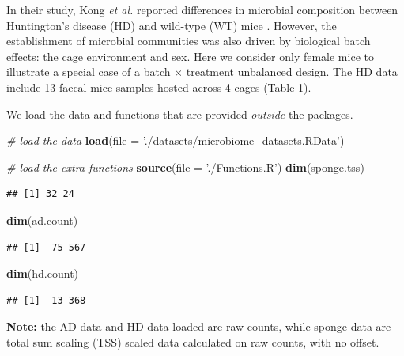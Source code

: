 \documentclass[]{book}
\newenvironment{Shaded}{\begin{snugshade}}{\end{snugshade}}
\newcommand{\KeywordTok}[1]{\textcolor[rgb]{0.13,0.29,0.53}{\textbf{#1}}}
\newcommand{\DataTypeTok}[1]{\textcolor[rgb]{0.13,0.29,0.53}{#1}}
\newcommand{\StringTok}[1]{\textcolor[rgb]{0.31,0.60,0.02}{#1}}
\newcommand{\CommentTok}[1]{\textcolor[rgb]{0.56,0.35,0.01}{\textit{#1}}}
\newcommand{\NormalTok}[1]{#1}
\begin{document}
In their study, Kong \emph{et al.} reported differences in microbial
composition between Huntington's disease (HD) and wild-type (WT) mice
\citep{kong2018microbiome}. However, the establishment of microbial
communities was also driven by biological batch effects: the cage
environment and sex. Here we consider only female mice to illustrate a
special case of a batch \(\times\) treatment unbalanced design. The HD
data include 13 faecal mice samples hosted across 4 cages (Table 1).

We load the data and functions that are provided \emph{outside} the
packages.

\begin{Shaded}
\begin{Highlighting}[]
\CommentTok{# load the data}
\KeywordTok{load}\NormalTok{(}\DataTypeTok{file =} \StringTok{'./datasets/microbiome_datasets.RData'}\NormalTok{)}

\CommentTok{# load the extra functions}
\KeywordTok{source}\NormalTok{(}\DataTypeTok{file =} \StringTok{'./Functions.R'}\NormalTok{)}
\KeywordTok{dim}\NormalTok{(sponge.tss)}
\end{Highlighting}
\end{Shaded}

\begin{verbatim}
## [1] 32 24
\end{verbatim}

\begin{Shaded}
\begin{Highlighting}[]
\KeywordTok{dim}\NormalTok{(ad.count)}
\end{Highlighting}
\end{Shaded}

\begin{verbatim}
## [1]  75 567
\end{verbatim}

\begin{Shaded}
\begin{Highlighting}[]
\KeywordTok{dim}\NormalTok{(hd.count)}
\end{Highlighting}
\end{Shaded}

\begin{verbatim}
## [1]  13 368
\end{verbatim}

\textbf{Note:} the AD data and HD data loaded are raw counts, while
sponge data are total sum scaling (TSS) scaled data calculated on raw
counts, with no offset.
\end{document}
